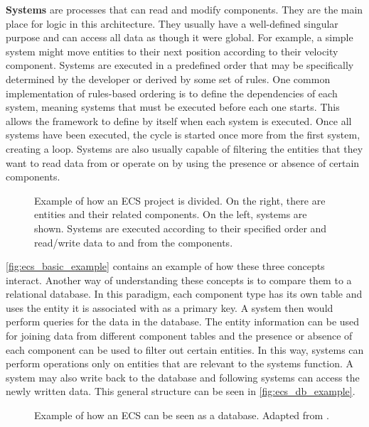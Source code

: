\documentclass[twoside, 11pt]{article}
\begin{document}
\textbf{Systems} are processes that can read and modify components. They are the main place for logic in this architecture. They usually have a well-defined singular purpose and can access all data as though it were global. For example, a simple system might move entities to their next position according to their velocity component. Systems are executed in a predefined order that may be specifically determined by the developer or derived by some set of rules. One common implementation of rules-based ordering is to define the dependencies of each system, meaning systems that must be executed before each one starts. This allows the framework to define by itself when each system is executed. Once all systems have been executed, the cycle is started once more from the first system, creating a loop. Systems are also usually capable of filtering the entities that they want to read data from or operate on by using the presence or absence of certain components.

\begin{figure}[h]
  \centering
  
  \caption[Example of how an ECS project is divided]{Example of how an ECS project is divided. On the right, there are entities and their related components. On the left, systems are shown. Systems are executed according to their specified order and read/write data to and from the components.}
  \label{fig:ecs_basic_example}
\end{figure}

\autoref{fig:ecs_basic_example} contains an example of how these three concepts interact.  Another way of understanding these concepts is to compare them to a relational database. In this paradigm, each component type has its own table and uses the entity it is associated with as a primary key. A system then would perform queries for the data in the database. The entity information can be used for joining data from different component tables and the presence or absence of each component can be used to filter out certain entities. In this way, systems can perform operations only on entities that are relevant to the systems function. A system may also write back to the database and following systems can access the newly written data. This general structure can be seen in \autoref{fig:ecs_db_example}.

\begin{figure}[h!]
  \centering
  
  \caption[Example of how an ECS can be seen as a database]{Example of how an ECS can be seen as a database. Adapted from \cite{csherratt}.}
  \label{fig:ecs_db_example}
\end{figure}
\end{document}
